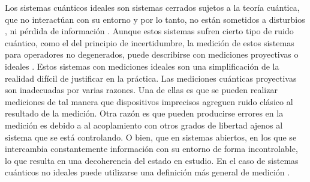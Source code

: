 Los sistemas cuánticos ideales son sistemas cerrados sujetos a la teoría
cuántica, que no interactúan con su entorno y por lo tanto, no están sometidos
a disturbios , ni pérdida de información . Aunque estos sistemas sufren cierto
tipo de ruido cuántico, como el del principio de incertidumbre, la medición de
estos sistemas para operadores no degenerados, puede describirse con mediciones
proyectivas o ideales . Estos sistemas con mediciones ideales son una
simplificación de la realidad difícil de justificar en la práctica. Las
mediciones cuánticas proyectivas son inadecuadas por varias razones. Una de
ellas es que se pueden realizar mediciones de tal manera que dispositivos
imprecisos agreguen ruido clásico al resultado de la medición. Otra razón es
que pueden producirse errores en la medición es debido a al acoplamiento con
otros grados de libertad ajenos al sistema que se está controlando. O bien, que
en sistemas abiertos, en los que se intercambia constantemente información con
su entorno de forma incontrolable, lo que resulta en una decoherencia del
estado en estudio. En el
caso de sistemas cuánticos no ideales puede utilizarse
una definición más general de medición {\cite{wilde2011classical,
jaeger2007quantum}}. 




